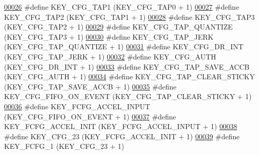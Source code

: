 \begin{DoxyCode}
\hypertarget{dmp_key_8h_source.tex_l00026}{}\hyperlink{dmp_key_8h_a2a7971149e8d561f5ff6a812990114f4}{00026} \textcolor{preprocessor}{#define KEY\_CFG\_TAP1                (KEY\_CFG\_TAP0 + 1)}
\hypertarget{dmp_key_8h_source.tex_l00027}{}\hyperlink{dmp_key_8h_a0cc1a00556dd860ae3fbb84c7b90f208}{00027} \textcolor{preprocessor}{#define KEY\_CFG\_TAP2                (KEY\_CFG\_TAP1 + 1)}
\hypertarget{dmp_key_8h_source.tex_l00028}{}\hyperlink{dmp_key_8h_a9ddb8947dd125a30491d45ee528af428}{00028} \textcolor{preprocessor}{#define KEY\_CFG\_TAP3                (KEY\_CFG\_TAP2 + 1)}
\hypertarget{dmp_key_8h_source.tex_l00029}{}\hyperlink{dmp_key_8h_a42cecc6cfd04d63187c3a42fcaffd85f}{00029} \textcolor{preprocessor}{#define KEY\_CFG\_TAP\_QUANTIZE        (KEY\_CFG\_TAP3 + 1)}
\hypertarget{dmp_key_8h_source.tex_l00030}{}\hyperlink{dmp_key_8h_a1cf1ef77505274a13b6480f1aa7d9389}{00030} \textcolor{preprocessor}{#define KEY\_CFG\_TAP\_JERK            (KEY\_CFG\_TAP\_QUANTIZE + 1)}
\hypertarget{dmp_key_8h_source.tex_l00031}{}\hyperlink{dmp_key_8h_a7879a5cc9e8d48368fdf66ecb4ea7016}{00031} \textcolor{preprocessor}{#define KEY\_CFG\_DR\_INT              (KEY\_CFG\_TAP\_JERK + 1)}
\hypertarget{dmp_key_8h_source.tex_l00032}{}\hyperlink{dmp_key_8h_ab2e0eac97341ae102666b036ca7b994c}{00032} \textcolor{preprocessor}{#define KEY\_CFG\_AUTH                (KEY\_CFG\_DR\_INT + 1)}
\hypertarget{dmp_key_8h_source.tex_l00033}{}\hyperlink{dmp_key_8h_af2b9a5e5491b57fbfe64a6d979b1ff45}{00033} \textcolor{preprocessor}{#define KEY\_CFG\_TAP\_SAVE\_ACCB       (KEY\_CFG\_AUTH + 1)}
\hypertarget{dmp_key_8h_source.tex_l00034}{}\hyperlink{dmp_key_8h_ae7725cddab0831815e93942e1fbb1278}{00034} \textcolor{preprocessor}{#define KEY\_CFG\_TAP\_CLEAR\_STICKY    (KEY\_CFG\_TAP\_SAVE\_ACCB + 1)}
\hypertarget{dmp_key_8h_source.tex_l00035}{}\hyperlink{dmp_key_8h_a68a87ce723375f0bb235e9fc4356a46b}{00035} \textcolor{preprocessor}{#define KEY\_CFG\_FIFO\_ON\_EVENT       (KEY\_CFG\_TAP\_CLEAR\_STICKY + 1)}
\hypertarget{dmp_key_8h_source.tex_l00036}{}\hyperlink{dmp_key_8h_af2254874bb524938b8749e524ed845d2}{00036} \textcolor{preprocessor}{#define KEY\_FCFG\_ACCEL\_INPUT        (KEY\_CFG\_FIFO\_ON\_EVENT + 1)}
\hypertarget{dmp_key_8h_source.tex_l00037}{}\hyperlink{dmp_key_8h_a893ccb4c34573d60c12c372d8b6649a6}{00037} \textcolor{preprocessor}{#define KEY\_FCFG\_ACCEL\_INIT         (KEY\_FCFG\_ACCEL\_INPUT + 1)}
\hypertarget{dmp_key_8h_source.tex_l00038}{}\hyperlink{dmp_key_8h_a3f98e9e85d79d49c0dac77d6855d603e}{00038} \textcolor{preprocessor}{#define KEY\_CFG\_23                  (KEY\_FCFG\_ACCEL\_INIT + 1)}
\hypertarget{dmp_key_8h_source.tex_l00039}{}\hyperlink{dmp_key_8h_a9b1a7d7daa4fb73fb03dabaf6f4c97b9}{00039} \textcolor{preprocessor}{#define KEY\_FCFG\_1                  (KEY\_CFG\_23 + 1)}

\end{DoxyCode}
